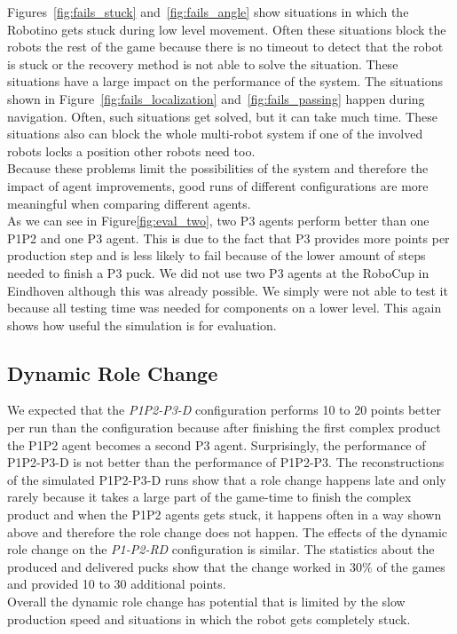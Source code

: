 Figures~\ref{fig:fails_stuck} and~\ref{fig:fails_angle} show situations in which the Robotino gets stuck during low level movement. Often these situations block the robots the rest of the game because there is no timeout to detect that the robot is stuck or the recovery method is not able to solve the situation. These situations have a large impact on the performance of the system. The situations shown in Figure~\ref{fig:fails_localization} and~\ref{fig:fails_passing} happen during navigation. Often, such situations get solved, but it can take much time. These situations also can block the whole multi-robot system if one of the involved robots locks a position other robots need too.\\
Because these problems limit the possibilities of the system and therefore the impact of agent improvements, good runs of different configurations are more meaningful when comparing different agents.\\
As we can see in Figure\ref{fig:eval_two}, two P3 agents perform better than one P1P2 and one P3 agent. This is due to the fact that P3 provides more points per production step and is less likely to fail because of the lower amount of steps needed to finish a P3 puck. We did not use two P3 agents at the RoboCup in Eindhoven although this was already possible. We simply were not able to test it because all testing time was needed for components on a lower level. This again shows how useful the simulation is for evaluation.

\subsection{Dynamic Role Change}
We expected that the \textit{P1P2-P3-D} configuration performs 10 to 20 points better per run than the  configuration because after finishing the first complex product the P1P2 agent becomes a second P3 agent. Surprisingly, the performance of P1P2-P3-D is not better than the performance of P1P2-P3. The reconstructions of the simulated P1P2-P3-D runs show that a role change happens late and only rarely because it takes a large part of the game-time to finish the complex product and when the P1P2 agents gets stuck, it happens often in a way shown above and therefore the role change does not happen. The effects of the dynamic role change on the \textit{P1-P2-RD} configuration is similar. The statistics about the produced and delivered pucks show that the change worked in $30\%$ of the games and provided 10 to 30 additional points.\\
Overall the dynamic role change has potential that is limited by the slow production speed and situations in which the robot gets completely stuck.

